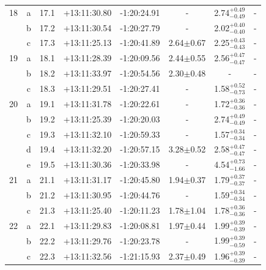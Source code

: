 \documentclass[useAMS,usenatbib]{mn2e}
\begin{document}
\begin{table}
\begin{tabular}{cccccccc}
     \hline							    		    	    				
       18 & a & 17.1 & +13:11:30.80 & -1:20:24.91 &      -        & 2.74$^{+0.49}_{-0.49}$ &       -      \\
          & b & 17.2 & +13:11:30.54 & -1:20:27.79 &      -        & 2.02$^{+0.40}_{-0.40}$ &       -      \\
          & c & 17.3 & +13:11:25.13 & -1:20:41.89 & 2.64$\pm$0.67 & 2.25$^{+0.43}_{-0.43}$ &       -      \\
     \hline							    		    	    				
       19 & a & 18.1 & +13:11:28.39 & -1:20:09.56 & 2.44$\pm$0.55 & 2.56$^{+0.47}_{-0.47}$ &       -      \\
          & b & 18.2 & +13:11:33.97 & -1:20:54.56 & 2.30$\pm$0.48 &  -                     &       -      \\
          & c & 18.3 & +13:11:29.51 & -1:20:27.41 &      -        & 1.58$^{+0.52}_{-0.73}$ &       -      \\
     \hline							    		    	    				
       20 & a & 19.1 & +13:11:31.78 & -1:20:22.61 &      -        & 1.72$^{+0.36}_{-0.36}$ &       -      \\
          & b & 19.2 & +13:11:25.39 & -1:20:20.03 &      -        & 2.74$^{+0.49}_{-0.49}$ &       -      \\
          & c & 19.3 & +13:11:32.10 & -1:20:59.33 &      -        & 1.57$^{+0.34}_{-0.34}$ &       -      \\
          & d & 19.4 & +13:11:32.20 & -1:20:57.15 & 3.28$\pm$0.52 & 2.58$^{+0.47}_{-0.47}$ &       -      \\
          & e & 19.5 & +13:11:30.36 & -1:20:33.98 &      -        & 4.54$^{+0.73}_{-1.66}$ &       -      \\
     \hline							    		    	    				
       21 & a & 21.1 & +13:11:31.17 & -1:20:45.80 & 1.94$\pm$0.37 & 1.79$^{+0.37}_{-0.37}$ &       -      \\
          & b & 21.2 & +13:11:30.95 & -1:20:44.76 &      -        & 1.59$^{+0.34}_{-0.34}$ &       -      \\
          & c & 21.3 & +13:11:25.40 & -1:20:11.23 & 1.78$\pm$1.04 & 1.78$^{+0.36}_{-0.36}$ &       -      \\
     \hline							    		    	    				
       22 & a & 22.1 & +13:11:29.83 & -1:20:08.81 & 1.97$\pm$0.44 & 1.99$^{+0.39}_{-0.39}$ &       -      \\
          & b & 22.2 & +13:11:29.76 & -1:20:23.78 &      -        & 1.99$^{+0.39}_{-0.59}$ &       -      \\
          & c & 22.3 & +13:11:32.56 & -1:21:15.93 & 2.37$\pm$0.49 & 1.96$^{+0.39}_{-0.39}$ &       -      \\

\end{tabular}
\end{table}
\end{document}
